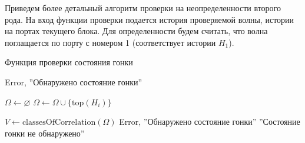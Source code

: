 \documentclass[10pt,a4paper]{article}
\newcommand{\FA}{F\!A}
\begin{document}
  Приведем более детальный алгоритм проверки на неопределенности второго рода.
  На вход функции проверки подается история проверяемой волны, истории на портах текущего блока. Для определенности будем считать, что
  волна поглащается по порту с номером 1 (соответствует истории $H_1$).
  
    \begin{algorithm}
    \caption{Функция проверки состояния гонки}
    \label{checkrace}
    \begin{algorithmic}[1]
          \State \Return Error, ''Обнаружено состояние гонки''
        \EndIf
        
        \Statex
        
        \State $\Omega \leftarrow \varnothing$
            \State $\Omega \leftarrow \Omega \cup \{\text{top}(H_i)\}$
          \EndIf
        \EndFor
        
        \Statex
        
        \State $V \leftarrow \text{classesOfCorrelation}(\Omega)$
            \If{$\FA_v(s, p \cup \{1\}) \neq \FA_v(s, p)$}
              \State \Return Error, ''Обнаружено состояние гонки''
            \EndIf
        \EndFor 
        \EndFor       
      \State \Return ''Состояние гонки не обнаружено''
      \EndFunction
    \end{algorithmic}
  \end{algorithm}
  
\end{document}
